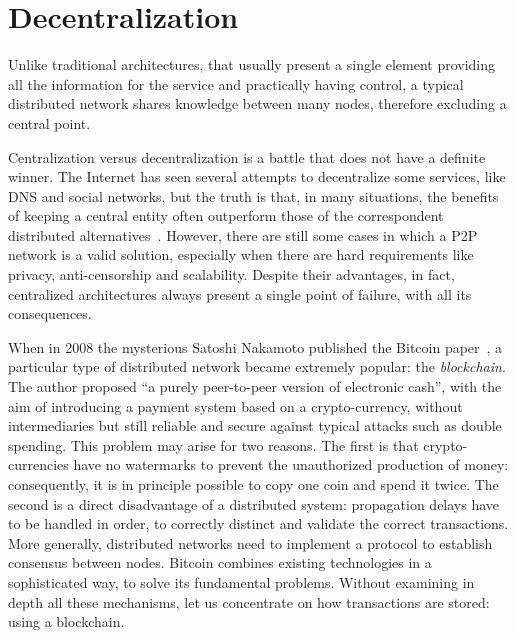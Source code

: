 \section{Decentralization}
\label{sec:decentralization}

Unlike traditional architectures, that usually present a single element providing all the information for the service and practically having control, a typical distributed network shares knowledge between many nodes, therefore excluding a central point.

Centralization versus decentralization is a battle that does not have a definite winner. The Internet has seen several attempts to decentralize some services, like DNS and social networks, but the truth is that, in many situations, the benefits of keeping a central entity often outperform those of the correspondent distributed alternatives~\cite{Montresor_Permissionless}. However, there are still some cases in which a P2P network is a valid solution, especially when there are hard requirements like privacy, anti-censorship and scalability. Despite their advantages, in fact, centralized architectures always present a single point of failure, with all its consequences.

When in 2008 the mysterious Satoshi Nakamoto published the Bitcoin paper~\cite{bitcoin}, a particular type of distributed network became extremely popular: the \emph{blockchain}. The author proposed ``a purely peer-to-peer version of electronic cash'', with the aim of introducing a payment system based on a crypto-currency, without intermediaries but still reliable and secure against typical attacks such as double spending. This problem may arise for two reasons. The first is that crypto-currencies have no watermarks to prevent the unauthorized production of money: consequently, it is in principle possible to copy one coin and spend it twice. The second is a direct disadvantage of a distributed system: propagation delays have to be handled in order, to correctly distinct and validate the correct transactions. More generally, distributed networks need to implement a protocol to establish consensus between nodes.
Bitcoin combines existing technologies in a sophisticated way, to solve its fundamental problems. Without examining in depth all these mechanisms, let us concentrate on how transactions are stored: using a blockchain.

